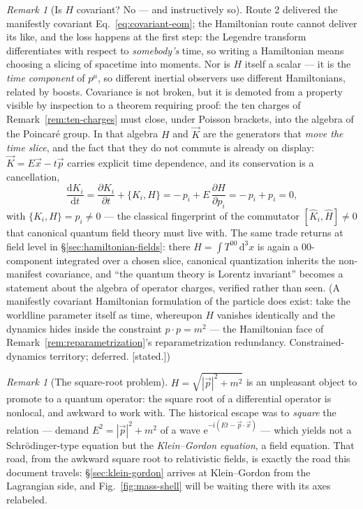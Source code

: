 \documentclass[11pt]{article}
\theoremstyle{plain}
\theoremstyle{definition}
\theoremstyle{remark}
\newtheorem{remark}[theorem]{Remark}
\newcommand{\dd}{\mathrm{d}}
\newcommand{\ee}{\mathrm{e}}
\newcommand{\ii}{\mathrm{i}}
\newcommand{\pd}[2]{\frac{\partial #1}{\partial #2}}
\newcommand{\tot}[2]{\frac{\dd #1}{\dd #2}}
\newcommand{\vx}{\vec{x}}
\newcommand{\vp}{\vec{p}}
\begin{document}
\begin{remark}[Is $H$ covariant? No --- and instructively so]
\label{rem:H-not-covariant}
Route 2 delivered the manifestly covariant
Eq.~\eqref{eq:covariant-eom}; the Hamiltonian route cannot deliver its
like, and the loss happens at the first step: the Legendre transform
differentiates with respect to \emph{somebody's} time, so writing a
Hamiltonian means choosing a slicing of spacetime into moments. Nor is
$H$ itself a scalar --- it is the \emph{time component} of $p^\mu$,
so different inertial observers use different Hamiltonians, related by
boosts. Covariance is not broken, but it is demoted from a property
visible by inspection to a theorem requiring proof: the ten charges of
Remark~\ref{rem:ten-charges} must close, under Poisson brackets, into
the algebra of the Poincar\'e group. In that algebra $H$ and $\vec K$
are the generators that \emph{move the time slice}, and the fact that
they do not commute is already on display:
$\vec K = E\vx - t\vp$ carries explicit time dependence, and its
conservation is a cancellation,
\begin{equation}
  \tot{K_i}{t}
  = \pd{K_i}{t} + \{K_i, H\}
  = -\,p_i + E\,\pd{H}{p_i}
  = -\,p_i + p_i = 0,
\end{equation}
with $\{K_i, H\} = p_i \neq 0$ --- the classical fingerprint of the
commutator $[\hat K_i, \hat H] \neq 0$ that canonical quantum field
theory must live with. The same trade returns at field level in
\S\ref{sec:hamiltonian-fields}: there $H = \int T^{00}\,\dd^3x$ is
again a $00$-component integrated over a chosen slice, canonical
quantization inherits the non-manifest covariance, and ``the quantum
theory is Lorentz invariant'' becomes a statement about the algebra of
operator charges, verified rather than seen. (A manifestly covariant
Hamiltonian formulation of the particle does exist: take the worldline
parameter itself as time, whereupon $H$ vanishes identically and the
dynamics hides inside the constraint $p \cdot p = m^2$ --- the
Hamiltonian face of Remark~\ref{rem:reparametrization}'s
reparametrization redundancy. Constrained-dynamics territory;
deferred. [stated.])
\end{remark}

\begin{remark}[The square-root problem]
\label{rem:square-root}
$H = \sqrt{|\vp|^2 + m^2}$ is an unpleasant object to promote to a
quantum operator: the square root of a differential operator is
nonlocal, and awkward to work with. The historical escape
was to \emph{square} the relation --- demand
$E^2 = |\vp|^2 + m^2$ of a wave $\ee^{-\ii(Et - \vp\cdot\vx)}$ ---
which yields not a Schr\"odinger-type equation but the
\emph{Klein--Gordon equation}, a field equation. That road, from the
awkward square root to relativistic fields, is exactly the road this
document travels: \S\ref{sec:klein-gordon} arrives at Klein--Gordon
from the Lagrangian side, and Fig.~\ref{fig:mass-shell} will be
waiting there with its axes relabeled.
\end{remark}
\end{document}
